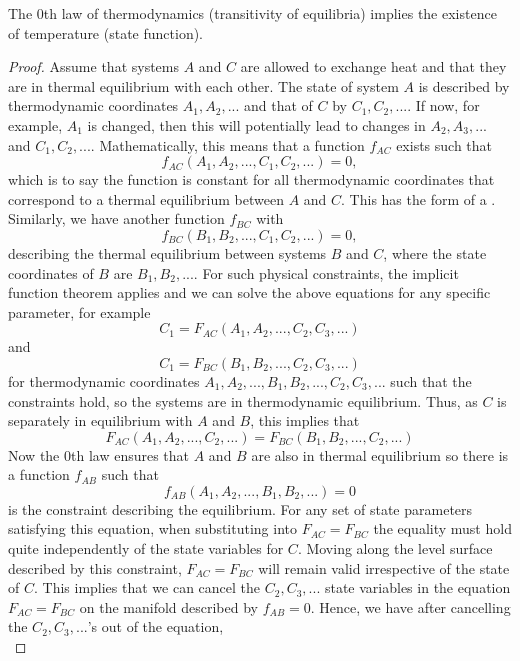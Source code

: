 \documentclass[12pt, a4paper, oneside, openright, titlepage]{book}
\begin{document}
\begin{cor}
    The $0$th law of thermodynamics (transitivity of equilibria) implies the existence of temperature (state function).
\end{cor}
\begin{proof}
    Assume that systems $A$ and $C$ are allowed to exchange heat and that they are in thermal equilibrium with each other. The state of system $A$ is described by thermodynamic coordinates $A_1,A_2,...$ and that of $C$ by $C_1,C_2,...$. If now, for example, $A_1$ is changed, then this will potentially lead to changes in $A_2,A_3,...$ and $C_1,C_2,...$. Mathematically, this means that a function $f_{AC}$ exists such that \begin{equation*}
        f_{AC}(A_1,A_2,...,C_1,C_2,...) = 0,
    \end{equation*}
    which is to say the function is constant for all thermodynamic coordinates that correspond to a thermal equilibrium between $A$ and $C$. This has the form of a . Similarly, we have another function $f_{BC}$ with \begin{equation*}
        f_{BC}(B_1,B_2,...,C_1,C_2,...) = 0,
    \end{equation*}
    describing the thermal equilibrium between systems $B$ and $C$, where the state coordinates of $B$ are $B_1,B_2,...$. For such physical constraints, the implicit function theorem applies and we can solve the above equations for any specific parameter, for example \begin{equation*}
        C_1 = F_{AC}(A_1,A_2,...,C_2,C_3,...)
    \end{equation*}
    and \begin{equation*}
        C_1 = F_{BC}(B_1,B_2,...,C_2,C_3,...)
    \end{equation*}
    for thermodynamic coordinates $A_1,A_2,...,B_1,B_2,...,C_2,C_3,...$ such that the constraints hold, so the systems are in thermodynamic equilibrium. Thus, as $C$ is separately in equilibrium with $A$ and $B$, this implies that \begin{equation*}
        F_{AC}(A_1,A_2,...,C_2,...) = F_{BC}(B_1,B_2,...,C_2,...)
    \end{equation*}
    Now the $0$th law ensures that $A$ and $B$ are also in thermal equilibrium so there is a function $f_{AB}$ such that \begin{equation*}
        f_{AB}(A_1,A_2,...,B_1,B_2,...) = 0
    \end{equation*}
    is the constraint describing the equilibrium. For any set of state parameters satisfying this equation, when substituting into $F_{AC} = F_{BC}$ the equality must hold quite independently of the state variables for $C$. Moving along the level surface described by this constraint, $F_{AC} = F_{BC}$ will remain valid irrespective of the state of $C$. This implies that we can cancel the $C_2,C_3,...$ state variables in the equation $F_{AC} = F_{BC}$ on the manifold described by $f_{AB} = 0$. Hence, we have after cancelling the $C_2,C_3,...$'s out of the equation, \begin{equation*}

\end{equation*}
\end{proof}
\end{document}
